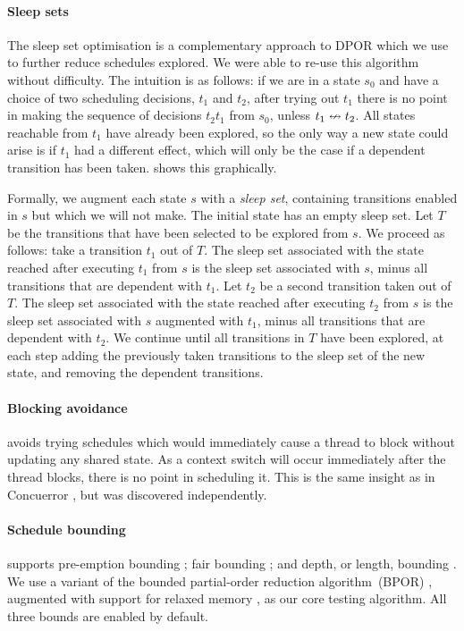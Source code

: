 \paragraph{Sleep sets}
The sleep set optimisation \parencite{godefroid1996} is a
complementary approach to DPOR which we use to further reduce
schedules explored.  We were able to re-use this algorithm without
difficulty.  The intuition is as follows: if we are in a state $s_{0}$
and have a choice of two scheduling decisions, $t_{1}$ and $t_{2}$,
after trying out $t_{1}$ there is no point in making the sequence of
decisions $t_{2}t_{1}$ from $s_{0}$, unless $t_{1} \nleftrightarrow t_{2}$.
All states reachable from $t_{1}$ have already been explored, so the
only way a new state could arise is if $t_{1}$ had a different effect,
which will only be the case if a dependent transition has been taken.
 shows this graphically.

Formally, we augment each state $s$ with a \emph{sleep set},
containing transitions enabled in $s$ but which we will not make.  The
initial state has an empty sleep set.  Let $T$ be the transitions that
have been selected to be explored from $s$.  We proceed as follows:
take a transition $t_{1}$ out of $T$.  The sleep set associated with
the state reached after executing $t_{1}$ from $s$ is the sleep set
associated with $s$, minus all transitions that are dependent with
$t_{1}$.  Let $t_{2}$ be a second transition taken out of $T$.  The
sleep set associated with the state reached after executing $t_{2}$
from $s$ is the sleep set associated with $s$ augmented with $t_{1}$,
minus all transitions that are dependent with $t_{2}$.  We continue
until all transitions in $T$ have been explored, at each step adding
the previously taken transitions to the sleep set of the new state,
and removing the dependent transitions.

\paragraph{Blocking avoidance}
\dejafu{} avoids trying schedules which would immediately cause a
thread to block without updating any shared state.  As a context
switch will occur immediately after the thread blocks, there is no
point in scheduling it.  This is the same insight as in Concuerror
\parencite{christakis2013}, but was discovered independently.

\paragraph{Schedule bounding}
\dejafu{} supports pre-emption bounding \parencite{musuvathi2007};
fair bounding \parencite{musuvathi2008}; and depth, or length,
bounding \parencite{russell2002}.  We use a variant of the bounded
partial-order reduction algorithm~(BPOR) \parencite{coons2013},
augmented with support for relaxed memory \parencite{zhang2015}, as
our core testing algorithm.  All three bounds are enabled by default.

